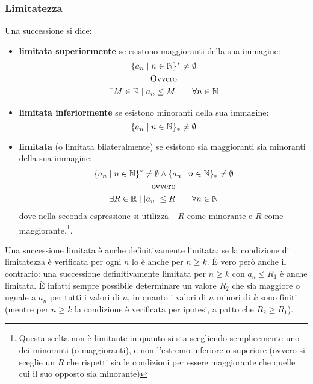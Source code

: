 \subsubsection{Limitatezza}
\begin{defin}[Limitatezza]
	Una successione si dice:
	\begin{itemize}
		\item \textbf{limitata superiormente} se esistono maggioranti della sua immagine:
		      \begin{gather*}
			      \{a_n\mid n\in\mathbb{N}\}^*\neq\emptyset\\
			      \text{Ovvero}\\
			      \exists M\in\mathbb{R}\mid a_n\leq M \qquad\forall n\in\mathbb{N}
		      \end{gather*}
		\item \textbf{limitata inferiormente} se esistono minoranti della sua immagine:
		      \[
			      \{a_n\mid n\in\mathbb{N}\}_*\neq\emptyset\\
		      \]
		\item \textbf{limitata} (o limitata bilateralmente) se esistono sia maggioranti sia minoranti della sua immagine:
		      \begin{gather*}
			      \{a_n\mid n\in\mathbb{N}\}^*\neq\emptyset \land \{a_n\mid n\in\mathbb{N}\}_*\neq\emptyset\\
			      \text{ovvero}\\
			      \exists R\in\mathbb{R}\mid \left\lvert a_n \right\rvert\leq R \qquad\forall n\in\mathbb{N}
		      \end{gather*}
		      dove nella seconda espressione si utilizza $-R$ come minorante e $R$ come maggiorante.\footnote{Questa scelta non è limitante in quanto si sta scegliendo semplicemente uno dei minoranti (o maggioranti), e non l'estremo inferiore o superiore (ovvero si sceglie un $R$ che rispetti sia le condizioni per essere maggiorante che quelle cui il suo opposto sia minorante)}.
	\end{itemize}
\end{defin}
Una successione limitata è anche definitivamente limitata: se la condizione di limitatezza è verificata per ogni $n$ lo è anche per $n\geq k$. È vero però anche il contrario: una successione definitivamente limitata per $n\geq k$ con $a_n\leq R_1$ è anche limitata. È infatti sempre possibile determinare un valore $R_2$ che sia maggiore o uguale a $a_n$ per tutti i valori di $n$, in quanto i valori di $n$ minori di $k$ sono finiti (mentre per $n\geq k$ la condizione è verificata per ipotesi, a patto che $R_2\geq R_1$).
